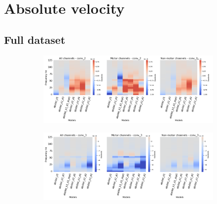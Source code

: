 \clearpage
\section*{Absolute velocity}\label{sec:absolute-velocity-appendixB}

\subsection*{Full dataset}\label{subsec:absVel-full-dataset-appendixB}
\begin{figure}[!htpb]
\centering
\begin{subfigure}[b]{\textwidth}
   \includegraphics[width=1\linewidth]{img/appendix/A/conv-2/sm/absVel-model-gradients-all_kinds}
   \caption{}
   \label{fig:absVel-shifted-grads-conv-2}
\end{subfigure}

\begin{subfigure}[b]{\textwidth}
   \includegraphics[width=1\linewidth]{img/appendix/A/conv-3/sm/absVel-model-gradients-all_kinds}
   \caption{}
   \label{fig:absVel-shifted-grads-conv-3}
\end{subfigure}
\end{figure}
\clearpage   

